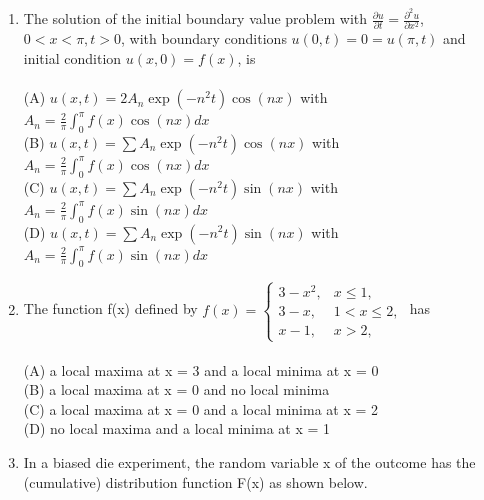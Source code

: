 \documentclass[journal,12pt,onecolumn]{IEEEtran}
\begin{document}
\begin{enumerate}[label=\textbf{Q\arabic*.},itemsep=2em]
\item The solution of the initial boundary value problem with $\frac{\partial u}{\partial t} = \frac{\partial^2 u}{\partial x^2}$, $0 < x < \pi, t > 0$, with boundary conditions $u(0,t)=0 = u(\pi, t)$ and initial condition $u(x,0) = f(x)$, is \\
\vspace{0.2cm}
\hfill{} \\
(A) $u(x,t) = 2 A_n \exp(-n^2 t) \cos(nx)$ with $A_n = \frac{2}{\pi} \int_0^{\pi} f(x) \cos(nx) dx$ \\
\vspace{0.2cm}
(B) $u(x,t) = \sum A_n \exp(-n^2 t) \cos(nx)$ with $A_n = \frac{2}{\pi} \int_0^{\pi} f(x) \cos(nx) dx$ \\
\vspace{0.2cm}
(C) $u(x,t) = \sum A_n \exp(-n^2 t) \sin(nx)$ with $A_n = \frac{2}{\pi} \int_0^{\pi} f(x) \sin(nx) dx$ \\
\vspace{0.2cm}
(D) $u(x,t) = \sum A_n \exp(-n^2 t) \sin(nx)$ with $A_n = \frac{2}{\pi} \int_0^{\pi} f(x) \sin(nx) dx$

\item The function f(x) defined by
$
f(x) = 
\begin{cases} 
3 - x^2, & x \leq 1, \\
3 - x, & 1 < x \leq 2, \\
x - 1, & x > 2,
\end{cases}
$ has\\ 
\vspace{0.2cm}
\hfill{} \\
(A) a local maxima at x = 3 and a local minima at x = 0 \\
(B) a local maxima at x = 0 and no local minima \\
(C) a local maxima at x = 0 and a local minima at x = 2 \\
(D) no local maxima and a local minima at x = 1


\newpage
\item In a biased die experiment, the random variable x of the outcome has the (cumulative) distribution function F(x) as shown below.


\end{enumerate}
\end{document}
